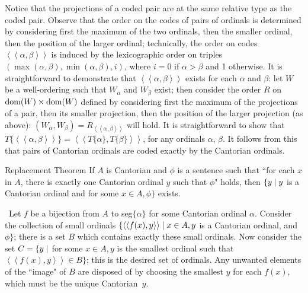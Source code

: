 Notice that the projections of a coded pair are at the same relative 
type as the coded pair.  Observe that the order on the codes of
pairs of ordinals is determined by considering first the
maximum of 
the two ordinals, then the smaller ordinal, then the position of the
larger ordinal; technically, the order on codes
$\left<\left<\alpha,\beta\right>\right>$ is induced by the
lexicographic order on triples
$(\max(\alpha,\beta),\min(\alpha,\beta),i)$, where $i = 0$ if
$\alpha > \beta$ and 1 otherwise.  It is straightforward to
demonstrate that $\left<\left<\alpha,\beta\right>\right>$ exists for
each $\alpha$ and $\beta$: let $W$ be a well-ordering
such that $W_{\alpha}$ and $W_{\beta}$ exist; then consider the order $R$ on
$\mathop{\mathrm{dom}}(W) \times \mathop{\mathrm{dom}}(W)$ defined by considering first the maximum of
the projections of a pair, then its smaller projection, then
the position of the larger projection (as above): $(W_{\alpha},W_{\beta}) =
R_{\left<\left<\alpha,\beta\right>\right>}$ will hold.  It is
straightforward to show that
$T\{\left<\left<\alpha,\beta\right>\right>\} =
\left<\left<T\{\alpha\},T\{\beta\}\right>\right>$, for any
ordinals $\alpha$, $\beta$.  It follows from this that pairs of
Cantorian ordinals are coded exactly by the Cantorian
ordinals.

\begin{Thm}{Replacement
Theorem}\label{repl-thm}
 If $A$ is Cantorian and $\phi$ is a sentence such that
 ``for each $x$ in $A$, there is exactly one Cantorian ordinal $y$ such that
 $\phi$" holds, then $\{y \mid y$ is a Cantorian ordinal and for some $x \in A,
 \phi\}$ exists.
\end{Thm}

\preuve\ Let $f$ be a bijection from $A$ to seg$\{\alpha\}$ for
some Cantorian ordinal $\alpha$.  Consider the collection of small
ordinals $\{\left<\left<f(x),y\right>\right> \mid x \in
A, y$ is a Cantorian ordinal, and $\phi\}$; there is a set $B$ which contains
exactly these small ordinals.  Now consider the set $C = \{y \mid$
for some $x \in A, y$ is the smallest ordinal such that
$\left<\left<f(x),y\right>\right> \in B\}$; this is the desired set
of ordinals.  Any unwanted elements of the ``image" of $B$ are
disposed of by choosing the smallest $y$ for each $f(x)$, which must
be the unique Cantorian~$y$.
\finpreuve

